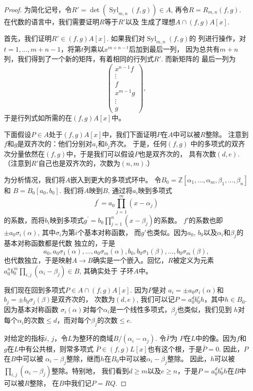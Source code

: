 \begin{proof}
为简化记号，令$R'=\operatorname{det}\left(\operatorname{Syl}_{m, n}(f, g)\right)
\in A$, 再令$R=R_{m,n}(f,g)$. 在代数的语言中，我们需要证明$R$等于$R'$以及
生成了理想$A\cap (f,g)A[x]$.

首先，我们证明$R'\in (f,g)A[x]$. 如果我们对$\operatorname{Syl}_{m, n}(f, g)$的
列进行操作，对$t=1,\dots,m+n-1$，将第$t$列乘以$x^{m+n-t}$后加到最后一列，
因为总共有$m+n$列，我们得到了一个新的矩阵，有着相同的行列式$R'$. 而新矩阵的
最后一列为
\[
    \begin{pmatrix}
        x^{n-1} f \\
        \vdots \\
        f \\
        x^{m-1} g \\
        \vdots \\
        g
    \end{pmatrix},
\]
于是行列式如所需的在$(f,g)A[x]$中。


下面假设$P\in A$处于$(f,g)A[x]$中，我们下面证明$P$在$A$中可以被$R$整除。
注意到$f$和$g$是双齐次的：他们分别对$a_i$和$b_j$齐次。 于是，任何$(f,g)$
中的多项式的双齐次分量依然在$(f,g)$中，于是我们可以假设$P$也是双齐次的，
具有次数$(d,e)$. （注意到$R'$自己也是双齐次的，次数为$(n,m)$.）

为分析情况，我们将$A$嵌入到更大的多项式环中。
令$B_0=\mathbb Z[\alpha_1,\dots,\alpha_m,\beta_1,\dots,\beta_n]$和
$B=B_0[a_0,b_0]$. 我们将$A$映到$B$, 通过将$a_i$映到多项式
\[
    f^{\prime}=a_0 \prod_{j=1}^m(x-\alpha_j)
\]
的系数，而将$b_i$映到多项式$g^{\prime}=b_0 \prod_{j=1}^n(x-\beta_j)$的系数。
$f'$的系数也即$\pm a_0\sigma_i(\alpha)$, 其中$\sigma_i$为第$i$个基本对称函数，
而$g'$也类似。因为$a_0$, $b_0$以及$\alpha_i$和$\beta_j$的基本对称函数都是代数
独立的，于是
\[
    a_0, a_0 \sigma_1(\alpha), \ldots, a_0 \sigma_m(\alpha), b_0, 
    b_0 \sigma_1(\beta), \ldots, b_0 \sigma_m(\beta),
\]
也代数独立，于是映射$A\to B$确实是一个嵌入。回忆，$R$被定义为元素
$a_0^n b_0^m \prod_{i, j}\left(\alpha_i-\beta_j\right) \in B$, 其确实处于
子环$A$中。

我们现在回到多项式$P \in A \cap(f, g) A[x]$. 因为$P$是对
$a_i= \pm a_0 \sigma_i(\alpha)$和$b_j= \pm b_0 \sigma_j(\beta)$是双齐次的，
次数为$(d,e)$, 我们可以记$P=a_0^d b_0^e h$，其中$h\in B_0$. 因为基本对称函数
$\sigma_i(\alpha)$对每个$\alpha_i$是一个线性多项式，$\beta_j$也类似，我们见到
$h$对每个$\alpha_i$的次数$\leq d$，而对每个$\beta_j$的次数$\leq e$.

对给定的指标$i$, $j$，令$L$为整环的商域$B/(\alpha_i-\alpha_j)$. 令$\bar P$为
$P$在$L$中的像。因为$f$和$g$在$L$中有公共根，则常多项式
$\bar P\in (f,g)L[x]$也有这个根，于是$\bar P=0$. 因此，$P$在$B$中可以被
$\alpha_i-\beta_j$整除，继而$h$在$B_0$中可以被$\alpha_i-\beta_j$整除。
因此，$h$可以被$\prod_{i, j}\left(\alpha_i-\beta_j\right)$整除。特别地，
我们看到$d\geq m$以及$e\geq n$，于是$P=a_0^d b_0^eh$在$B$中可以被$R$整除，
在$B$中我们记$P=RQ$.


\end{proof}
